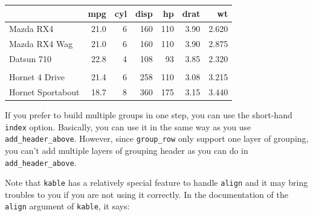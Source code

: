 \documentclass[table]{article}
\newenvironment{Shaded}{\begin{snugshade}}{\end{snugshade}}
\newcommand{\CommentTok}[1]{\textcolor[rgb]{0.56,0.35,0.01}{\textit{#1}}}
\newcommand{\DataTypeTok}[1]{\textcolor[rgb]{0.13,0.29,0.53}{#1}}
\newcommand{\DecValTok}[1]{\textcolor[rgb]{0.00,0.00,0.81}{#1}}
\newcommand{\KeywordTok}[1]{\textcolor[rgb]{0.13,0.29,0.53}{\textbf{#1}}}
\newcommand{\NormalTok}[1]{#1}
\newcommand{\OperatorTok}[1]{\textcolor[rgb]{0.81,0.36,0.00}{\textbf{#1}}}
\newcommand{\StringTok}[1]{\textcolor[rgb]{0.31,0.60,0.02}{#1}}
\begin{document}
\begin{tabular}{lrrrrrr}
\toprule
  & mpg & cyl & disp & hp & drat & wt\\
\midrule
Mazda RX4 & 21.0 & 6 & 160 & 110 & 3.90 & 2.620\\
Mazda RX4 Wag & 21.0 & 6 & 160 & 110 & 3.90 & 2.875\\
Datsun 710 & 22.8 & 4 & 108 & 93 & 3.85 & 2.320\\
\addlinespace[2em]
\multicolumn{7}{l}{\textbf{Group 1}}\\
\hspace{1em}Hornet 4 Drive & 21.4 & 6 & 258 & 110 & 3.08 & 3.215\\
\hspace{1em}Hornet Sportabout & 18.7 & 8 & 360 & 175 & 3.15 & 3.440\\
\bottomrule
\end{tabular}

If you prefer to build multiple groups in one step, you can use the
short-hand \texttt{index} option. Basically, you can use it in the same
way as you use \texttt{add\_header\_above}. However, since
\texttt{group\_row} only support one layer of grouping, you can't add
multiple layers of grouping header as you can do in
\texttt{add\_header\_above}.

\begin{Shaded}
\end{Shaded}

Note that \texttt{kable} has a relatively special feature to handle
\texttt{align} and it may bring troubles to you if you are not using it
correctly. In the documentation of the \texttt{align} argument of
\texttt{kable}, it says:
\end{document}
